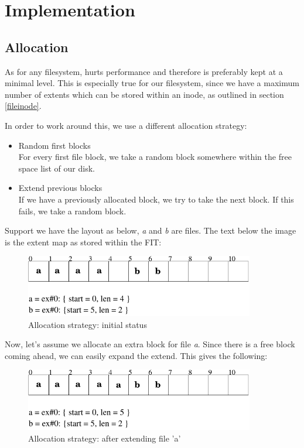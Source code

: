 \chapter{Implementation}

\section{Allocation}
\label{allocation}

As for any filesystem,  hurts performance and therefore is preferably kept at a minimal level. This is especially true for our filesystem, since we have a maximum number of extents which can be stored within an inode, as outlined in section \ref{fileinode}.

In order to work around this, we use a different allocation strategy:

\begin{itemize}
\item Random first blocks \\
For every first file block, we take a random block somewhere within the free space list of our disk.
\item Extend previous blocks \\
If we have a previously allocated block, we try to take the next block. If this fails, we take a random block.
\end{itemize}

Support we have the layout as below, \emph{a} and \emph{b} are files. The text below the image is the extent map as stored within the FIT:

\begin{figure}[h]
\includegraphics[width=10cm]{alloc1}
\caption{Allocation strategy: initial status}
\end{figure}

Now, let's assume we allocate an extra block for file \emph{a}. Since there is a free block coming ahead, we can easily expand the extend. This gives the following:

\begin{figure}[h]
\includegraphics[width=10cm]{alloc2}
\caption{Allocation strategy: after extending file 'a'}
\end{figure}

